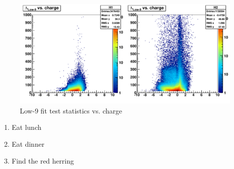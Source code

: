 \begin{figure}
   \includegraphics[width=120mm]{DailyLog/6324/6324HTestStatisticsLow9VsCharge.pdf}
   \caption{Low-9 fit test statistics vs. charge}
   \label{Figure_6324HTestStatisticsLow9VsCharge}
\end{figure}



\begin{enumerate}
\item Eat lunch
\item Eat dinner
\item Find the red herring
\end{enumerate}


